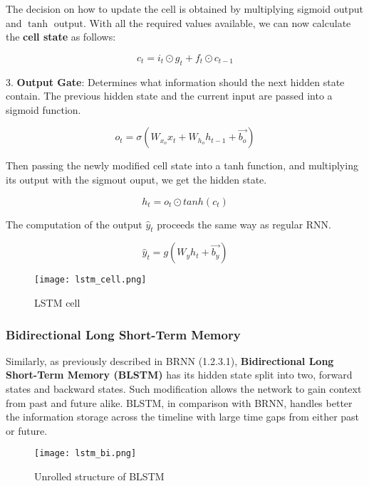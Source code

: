 The decision on how to update the cell is obtained by multiplying sigmoid output and $\tanh$ output. With all the required values available, we can now calculate the \textbf{cell state} as follows:

\begin{equation}
    {c_t = i_t \odot g_t + f_t \odot c_{t-1}}
\end{equation}


3. \textbf{Output Gate}: Determines what information should the next hidden state contain. The previous hidden state and the current input are passed into a sigmoid function.

\begin{equation}
    {o_t = \sigma(W_{x_o}x_t + W_{h_o}h_{t-1}+\vec{b_o})}
\end{equation}

Then passing the newly modified cell state into a tanh function, and multiplying its output with the sigmout ouput, we get the hidden state.\cite{guideLSTM}

\begin{equation}
    {h_t = o_t \odot tanh(c_t)}
\end{equation}


The computation of the output $\hat{y}_t$ proceeds the same way as regular RNN.\cite{matous}

\begin{equation}
    {\hat{y}_t = g(W_{y}h_t + \vec{b_y})}
\end{equation}

\begin{figure}[h]
	\centering
    \texttt{[image: lstm\_cell.png]}
	\caption{LSTM cell \cite{lstmcell_img}}
	\label{fig:lstmCell}
\end{figure}

\subsubsection{Bidirectional Long Short-Term Memory}

Similarly, as previously described in BRNN (1.2.3.1), \textbf{Bidirectional Long Short-Term Memory (BLSTM)} has its hidden state split into two, forward states and backward states. Such modification allows the network to gain context from past and future alike. BLSTM, in comparison with BRNN, handles better the information storage across the timeline with large time gaps from either past or future.

\begin{figure}[h]
	\centering
    \texttt{[image: lstm\_bi.png]}
	\caption{Unrolled structure of BLSTM \cite{matous}}
	\label{fig:blstm}
\end{figure}

